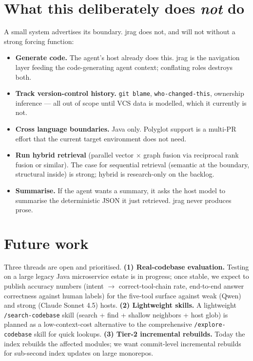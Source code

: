 \documentclass[11pt,a4paper]{article}
\begin{document}
\section{What this deliberately does \emph{not} do}
\label{sec:nondoes}

A small system advertises its boundary. jrag does not, and will not without a strong forcing function:

\begin{itemize}
\item \textbf{Generate code.} The agent's host already does this. jrag is the navigation layer feeding the code-generating agent context; conflating roles destroys both.
\item \textbf{Track version-control history.} \texttt{git blame}, \texttt{who-changed-this}, ownership inference --- all out of scope until VCS data is modelled, which it currently is not.
\item \textbf{Cross language boundaries.} Java only. Polyglot support is a multi-PR effort that the current target environment does not need.
\item \textbf{Run hybrid retrieval} (parallel vector $\times$ graph fusion via reciprocal rank fusion or similar). The case for sequential retrieval (semantic at the boundary, structural inside) is strong; hybrid is research-only on the backlog.
\item \textbf{Summarise.} If the agent wants a summary, it asks the host model to summarise the deterministic JSON it just retrieved. jrag never produces prose.
\end{itemize}

\section{Future work}
\label{sec:future}

{\sloppy
Three threads are open and prioritised. \textbf{(1) Real-codebase evaluation.} Testing on a large legacy Java microservice estate is in progress; once stable, we expect to publish accuracy numbers (intent $\to$ correct-tool-chain rate, end-to-end answer correctness against human labels) for the five-tool surface against weak (Qwen) and strong (Claude Sonnet 4.5) hosts. \textbf{(2) Lightweight skills.} A lightweight \texttt{/search-codebase} skill (search + find + shallow neighbors + host glob) is planned as a low-context-cost alternative to the comprehensive \texttt{/explore-codebase} skill for quick lookups. \textbf{(3) Tier-2 incremental rebuilds.} Today the index rebuilds the affected modules; we want commit-level incremental rebuilds for sub-second index updates on large monorepos.
\par}
\end{document}

